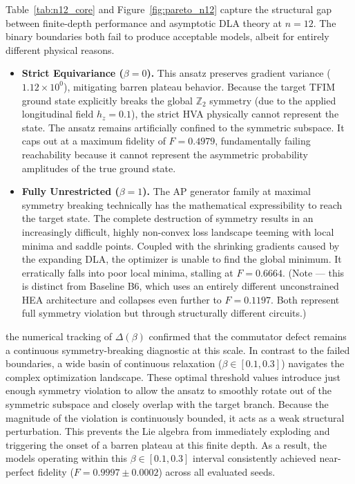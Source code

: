 \documentclass[10pt,twocolumn]{article}
\theoremstyle{remark}
\begin{document}
Table~\ref{tab:n12_core} and Figure~\ref{fig:pareto_n12} capture the structural gap between finite-depth performance and asymptotic DLA theory at $n=12$. The binary boundaries both fail to produce acceptable models, albeit for entirely different physical reasons.
\begin{itemize}
    \item \textbf{Strict Equivariance ($\beta=0$).} This ansatz preserves gradient variance ($1.12 \times 10^0$), mitigating barren plateau behavior. Because the target TFIM ground state explicitly breaks the global $\mathbb{Z}_2$ symmetry (due to the applied longitudinal field $h_z=0.1$), the strict HVA physically cannot represent the state. The ansatz remains artificially confined to the symmetric subspace. It caps out at a maximum fidelity of $F=0.4979$, fundamentally failing reachability because it cannot represent the asymmetric probability amplitudes of the true ground state.
    \item \textbf{Fully Unrestricted ($\beta=1$).} The AP generator family at maximal symmetry breaking technically has the mathematical expressibility to reach the target state. The complete destruction of symmetry results in an increasingly difficult, highly non-convex loss landscape teeming with local minima and saddle points. Coupled with the shrinking gradients caused by the expanding DLA, the optimizer is unable to find the global minimum. It erratically falls into poor local minima, stalling at $F=0.6664$. (Note --- this is distinct from Baseline B6, which uses an entirely different unconstrained HEA architecture and collapses even further to $F=0.1197$. Both represent full symmetry violation but through structurally different circuits.)
\end{itemize}


the numerical tracking of $\Delta(\beta)$ confirmed that the commutator defect remains a continuous symmetry-breaking diagnostic at this scale. In contrast to the failed boundaries, a wide basin of continuous relaxation ($\beta \in [0.1, 0.3]$) navigates the complex optimization landscape. These optimal threshold values introduce just enough symmetry violation to allow the ansatz to smoothly rotate out of the symmetric subspace and closely overlap with the target branch. Because the magnitude of the violation is continuously bounded, it acts as a weak structural perturbation. This prevents the Lie algebra from immediately exploding and triggering the onset of a barren plateau at this finite depth. As a result, the models operating within this $\beta \in [0.1, 0.3]$ interval consistently achieved near-perfect fidelity ($F=0.9997 \pm 0.0002$) across all evaluated seeds.
\end{document}
